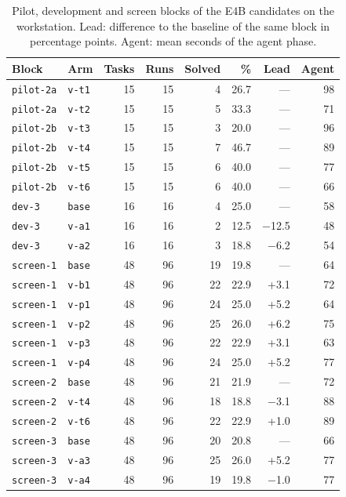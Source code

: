 \begin{table}[p]
\centering
\footnotesize
\caption{Pilot, development and screen blocks of the E4B candidates on the workstation. Lead: difference to the baseline of the same block in percentage points. Agent: mean seconds of the agent phase.}
\label{tab:screens}
\begin{tabular}{llrrrrrr}
\toprule
Block & Arm & Tasks & Runs & Solved & \% & Lead & Agent \\
\midrule
\texttt{pilot-2a} & \texttt{v-t1} & 15 & 15 & 4 & 26.7 & --- & 98 \\
\texttt{pilot-2a} & \texttt{v-t2} & 15 & 15 & 5 & 33.3 & --- & 71 \\
\addlinespace
\texttt{pilot-2b} & \texttt{v-t3} & 15 & 15 & 3 & 20.0 & --- & 96 \\
\texttt{pilot-2b} & \texttt{v-t4} & 15 & 15 & 7 & 46.7 & --- & 89 \\
\texttt{pilot-2b} & \texttt{v-t5} & 15 & 15 & 6 & 40.0 & --- & 77 \\
\texttt{pilot-2b} & \texttt{v-t6} & 15 & 15 & 6 & 40.0 & --- & 66 \\
\addlinespace
\texttt{dev-3} & \texttt{base} & 16 & 16 & 4 & 25.0 & --- & 58 \\
\texttt{dev-3} & \texttt{v-a1} & 16 & 16 & 2 & 12.5 & \ensuremath{-}12.5 & 48 \\
\texttt{dev-3} & \texttt{v-a2} & 16 & 16 & 3 & 18.8 & \ensuremath{-}6.2 & 54 \\
\addlinespace
\texttt{screen-1} & \texttt{base} & 48 & 96 & 19 & 19.8 & --- & 64 \\
\texttt{screen-1} & \texttt{v-b1} & 48 & 96 & 22 & 22.9 & +3.1 & 72 \\
\texttt{screen-1} & \texttt{v-p1} & 48 & 96 & 24 & 25.0 & +5.2 & 64 \\
\texttt{screen-1} & \texttt{v-p2} & 48 & 96 & 25 & 26.0 & +6.2 & 75 \\
\texttt{screen-1} & \texttt{v-p3} & 48 & 96 & 22 & 22.9 & +3.1 & 63 \\
\texttt{screen-1} & \texttt{v-p4} & 48 & 96 & 24 & 25.0 & +5.2 & 77 \\
\addlinespace
\texttt{screen-2} & \texttt{base} & 48 & 96 & 21 & 21.9 & --- & 72 \\
\texttt{screen-2} & \texttt{v-t4} & 48 & 96 & 18 & 18.8 & \ensuremath{-}3.1 & 88 \\
\texttt{screen-2} & \texttt{v-t6} & 48 & 96 & 22 & 22.9 & +1.0 & 89 \\
\addlinespace
\texttt{screen-3} & \texttt{base} & 48 & 96 & 20 & 20.8 & --- & 66 \\
\texttt{screen-3} & \texttt{v-a3} & 48 & 96 & 25 & 26.0 & +5.2 & 77 \\
\texttt{screen-3} & \texttt{v-a4} & 48 & 96 & 19 & 19.8 & \ensuremath{-}1.0 & 77 \\
\bottomrule
\end{tabular}
\end{table}
